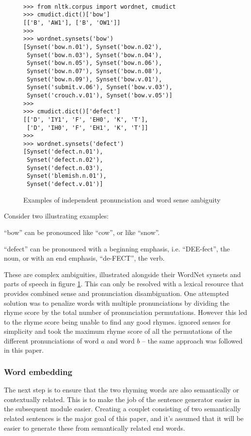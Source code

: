 \documentclass[11pt,a4paper]{article}
\newenvironment{tight_enumerate}{
\begin{enumerate}
\setlength{\itemsep}{0pt}
\setlength{\parskip}{0pt}
}{\end{enumerate}}
\begin{document}
\begin{figure}
\begin{Verbatim}[fontsize=\small]

>>> from nltk.corpus import wordnet, cmudict
>>> cmudict.dict()['bow']
[['B', 'AW1'], ['B', 'OW1']]
>>>
>>> wordnet.synsets('bow')
[Synset('bow.n.01'), Synset('bow.n.02'),
 Synset('bow.n.03'), Synset('bow.n.04'),
 Synset('bow.n.05'), Synset('bow.n.06'),
 Synset('bow.n.07'), Synset('bow.n.08'),
 Synset('bow.n.09'), Synset('bow.v.01'),
 Synset('submit.v.06'), Synset('bow.v.03'),
 Synset('crouch.v.01'), Synset('bow.v.05')]
>>>
>>> cmudict.dict()['defect']
[['D', 'IY1', 'F', 'EH0', 'K', 'T'],
 ['D', 'IH0', 'F', 'EH1', 'K', 'T']]
>>>
>>> wordnet.synsets('defect')
[Synset('defect.n.01'),
 Synset('defect.n.02'),
 Synset('defect.n.03'),
 Synset('blemish.n.01'),
 Synset('defect.v.01')]
\end{Verbatim}
\caption{Examples of independent pronunciation and word sense ambiguity}
\label{fig:wordnet}
\end{figure}

Consider two illustrating examples:
\begin{tight_enumerate}
	\vspace{-0.5em}
	\item
		``bow'' can be pronounced like ``cow'', or like ``snow''.
	\item
		``defect'' can be pronounced with a beginning emphasis, i.e. ``DEE-fect'', the noun, or with an end emphasis, ``de-FECT'', the verb.
\end{tight_enumerate}

These are complex ambiguities, illustrated alongside their WordNet synsets and parts of speech in figure \ref{fig:wordnet}. This can only be resolved with a lexical resource that provides combined sense and pronunciation disambiguation. One attempted solution was to penalize words with multiple pronunciations by dividing the rhyme score by the total number of pronunciation permutations. However this led to the rhyme score being unable to find any good rhymes. \citet{keswarani} ignored senses for simplicity and took the maximum rhyme score of all the permutations of the different pronunciations of word $a$ and word $b$ -- the same approach was followed in this paper.

\subsubsection{Word embedding}
\label{sec:fasttext}
The next step is to ensure that the two rhyming words are also semantically or contextually related. This is to make the job of the sentence generator easier in the subsequent module easier. Creating a couplet consisting of two semantically related sentences is the major goal of this paper, and it's assumed that it will be easier to generate these from semantically related end words.
\end{document}

